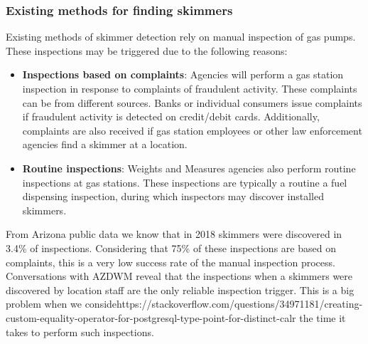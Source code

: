 \subsubsection*{Existing methods for finding skimmers}
\label{sec:existingskimmerdetection}

Existing methods of skimmer detection rely on manual inspection of gas pumps. These inspections may be triggered due to the following reasons:
\begin{itemize}
	\item \textbf{Inspections based on complaints}: Agencies will perform a gas station inspection in response to complaints of fraudulent activity. These complaints can be from different sources. Banks or individual consumers issue complaints if fraudulent activity is detected on credit/debit cards. Additionally, complaints are also received if gas station employees or other law enforcement agencies find a skimmer at a location.
	\item \textbf{Routine inspections}: Weights and Measures agencies also perform routine inspections at gas stations. These inspections are typically a routine a fuel dispensing inspection, during which inspectors may discover installed skimmers. 
\end{itemize}

From Arizona public data we know that in 2018 skimmers were discovered in 3.4\% of inspections. Considering that 75\% of these inspections are based on complaints, this is a very low success rate of the manual inspection process. Conversations with AZDWM reveal that the inspections when a skimmers were discovered by location staff are the only reliable inspection trigger. This is a big problem when we considehttps://stackoverflow.com/questions/34971181/creating-custom-equality-operator-for-postgresql-type-point-for-distinct-calr the time it takes to perform such inspections.



